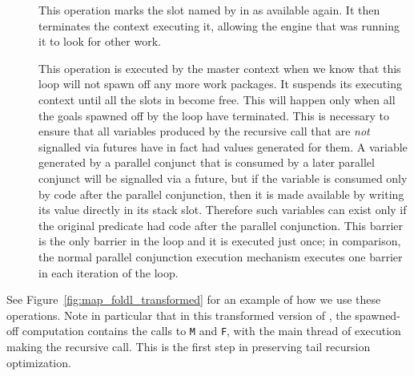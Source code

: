 \begin{description}
%

\item[]
This operation marks the slot named by \LCS{} in \LC{} as available again.
It then terminates the context executing it,
allowing the engine that was running it to look for other work.
\item[]
This operation is executed by the master context when we know
that this loop will not spawn off any more work packages.
It suspends its executing context
until all the slots in \LC{} become free.
This will happen only when all the goals spawned off by the loop
have terminated.
This is necessary to ensure that
all variables produced by the recursive call
that are \emph{not} signalled via futures
have in fact had values generated for them.
A variable generated by a parallel conjunct
that is consumed by a later parallel conjunct will be signalled via a future,
but if the variable is consumed only by code after the parallel conjunction,
then it is made available by writing its value directly in its stack
slot.
Therefore such variables can exist
only if the original predicate had code after the parallel conjunction.
This barrier is the only barrier in the loop and it is executed just once;
in comparison, the normal parallel conjunction execution mechanism
executes one barrier in each iteration of the loop.
\end{description}

\noindent
See Figure~\ref{fig:map_foldl_transformed}
for an example of how we use these operations.
Note in particular that in this transformed version of \mapfoldl{},
the spawned-off computation contains the calls to \texttt{M} and \texttt{F},
with the main thread of execution making the recursive call.
This is the first step in preserving tail recursion optimization.

